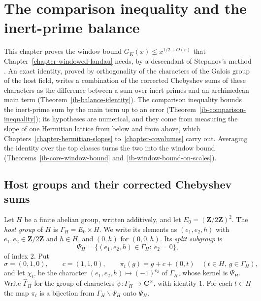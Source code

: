 \chapter{The comparison inequality and the inert-prime balance}\label{chapter-inert-prime-balance}

This chapter proves the window bound $G_K(x)\leq x^{1/2+O(\varepsilon)}$ that
Chapter~\ref{chapter-windowed-landau} needs, by a descendant of Stepanov's method
\cite{Ste69}. An exact identity, proved by orthogonality of the characters of the
Galois group of the host field, writes a combination of the corrected Chebyshev
sums of these characters as the difference between a sum over inert primes and an
archimedean main term (Theorem~\ref{ib-balance-identity}). The comparison
inequality bounds the inert-prime sum by the main term up to an error
(Theorem~\ref{ib-comparison-inequality}); its hypotheses are numerical, and they
come from measuring the slope of one Hermitian lattice from below and from above,
which Chapters~\ref{chapter-hermitian-slopes} to~\ref{chapter-covolumes} carry
out. Averaging the identity over the top classes turns the two into the window
bound (Theorems~\ref{ib-core-window-bound} and~\ref{ib-window-bound-on-scales}).

\section{Host groups and their corrected Chebyshev sums}\label{section-ib-host-groups}

\begin{definition}\label{ib-host-group}
Let $H$ be a finite abelian group, written additively, and let
$E_0=(\mathbf Z/2\mathbf Z)^2$. The \emph{host group} of $H$ is
$\Gamma_H=E_0\times H$. We write its elements as $(e_1,e_2,h)$ with
$e_1,e_2\in\mathbf Z/2\mathbf Z$ and $h\in H$, and $(0,h)$ for $(0,0,h)$. Its
\emph{split subgroup} is
\[
 \Psi_H=\{(e_1,e_2,h)\in\Gamma_H:\ e_2=0\},
\]
of index $2$. Put
\[
 \sigma=(0,1,0),\qquad c=(1,1,0),\qquad
 \pi_t(g)=g+c+(0,t)\quad(t\in H,\ g\in\Gamma_H),
\]
and let $\chi_C$ be the character $(e_1,e_2,h)\mapsto(-1)^{e_2}$ of $\Gamma_H$,
whose kernel is $\Psi_H$. Write $\widehat\Gamma_H$ for the group of characters
$\psi:\Gamma_H\to\mathbf C^\times$, with identity $1$. For each $t\in H$ the map
$\pi_t$ is a bijection from $\Gamma_H\smallsetminus\Psi_H$ onto $\Psi_H$.
\end{definition}

